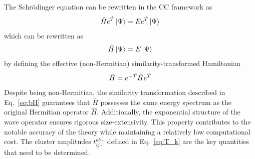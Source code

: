 \documentclass[aip,jcp,reprint,noshowkeys,superscriptaddress]{revtex4-1}
\newcommand{\hT}{\Hat{T}}
\newcommand{\hH}{\Hat{H}}
\begin{document}
The Schrödinger equation can be rewritten in the CC framework as
\begin{equation}
	\hH e^{\hT} \ket{\Psi} = E e^{\hT} \ket{\Psi}
\end{equation}
which can be rewritten as 
\begin{equation}
	\Bar{H} \ket{\Psi} = E \ket{\Psi}
\end{equation}
by defining the effective (non-Hermitian) similarity-transformed Hamiltonian 
\begin{equation}
	\label{eq:bH}
	\Bar{H} = e^{-\hT} \hH e^{\hT}
\end{equation}
Despite being non-Hermitian, the similarity transformation described in Eq.~\eqref{eq:bH} guarantees that $\bar{H}$ possesses the same energy spectrum as the original Hermitian operator $\hat{H}$. Additionally, the exponential structure of the wave operator ensures rigorous size-extensivity. This property contributes to the notable accuracy of the theory while maintaining a relatively low computational cost. The cluster amplitudes $t_{ij\cdots}^{ab\cdots}$ defined in Eq.~\eqref{eq:T_k} are the key quantities that need to be determined.
\end{document}
